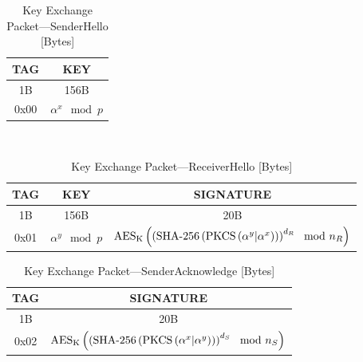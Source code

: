 \documentclass[a4paper]{article}
\begin{document}
\begin{table}[H]
    \begin{center}
        \begin{tabular}{| c | c |}
            \hline
            TAG & KEY \\ \hline\hline
            1B & 156B \\ \hline
            0x00 & $\alpha^x\mod{p}$ \\
            \hline
        \end{tabular}
    \end{center}
    \
    \caption{Key Exchange Packet---SenderHello [Bytes]}
    \label{tab:key_exchange_packet_senderhello}
\end{table}
\begin{table}[H]
    \begin{center}
        \begin{tabular}{| c | c | c |}
            \hline
            TAG & KEY & SIGNATURE \\ \hline\hline
            1B & 156B & 20B \\ \hline
            0x01 & $\alpha^y\mod{p}$ & $\text{AES}_\text{K}\left(\left(\text{SHA-256}\left(\text{PKCS}\left(\alpha^y\small|\alpha^x\right)\right)\right)^{d_R}\mod{n_R}\right)$\\
            \hline
        \end{tabular}
    \end{center}
    
    \caption{Key Exchange Packet---ReceiverHello [Bytes]}
    \label{tab:key_exchange_packet_receiverhello}
\end{table}
\begin{table}[H]
    \begin{center}
        \begin{tabular}{| c | c |}
            \hline
            TAG & SIGNATURE \\ \hline\hline
            1B & 20B \\ \hline
            0x02 & $\text{AES}_\text{K}\left(\left(\text{SHA-256}\left(\text{PKCS}\left(\alpha^x \small|\alpha^y\right)\right)\right)^{d_S}\mod{n_S}\right)$\\
            \hline
        \end{tabular}
    \end{center}

    \caption{Key Exchange Packet---SenderAcknowledge [Bytes]}
    \label{tab:key_exchange_packet_senderacknowledge}
\end{table}
\end{document}
